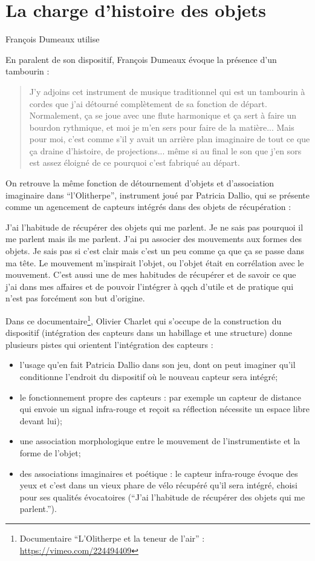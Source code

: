 \section{La charge d'histoire des objets}
François Dumeaux utilise 

En paralent de son dispositif, François Dumeaux évoque la présence d'un tambourin :
\begin{quotation}
J'y adjoins cet instrument de musique traditionnel qui est un tambourin à cordes que j'ai détourné complètement de sa fonction de départ. Normalement, ça se joue avec une flute harmonique et ça sert à faire un bourdon rythmique, et moi je m'en sers pour faire de la matière... Mais pour moi, c'est comme s'il y avait un arrière plan imaginaire de tout ce que ça draine d'histoire, de projections... même si au final le son que j'en sors est assez éloigné de ce pourquoi c'est fabriqué au départ.
\end{quotation}

On retrouve la même fonction de détournement d'objets et d'association imaginaire dans ``l'Olitherpe'', instrument joué par Patricia Dallio, qui se présente comme un agencement de capteurs intégrés dans des objets de récupération : 

J'ai l'habitude de récupérer des objets qui me parlent. Je ne sais pas pourquoi il me parlent mais ils me parlent. J'ai pu associer des mouvements aux formes des objets. Je sais pas si c'est clair mais c'est un peu comme ça que ça se passe dans ma tête. Le mouvement m'inspirait l'objet, ou l'objet était en corrélation avec le mouvement. C'est aussi une de mes habitudes de récupérer et de savoir ce que j'ai dans mes affaires et de pouvoir l'intégrer à qqch d'utile et de pratique qui n'est pas forcément son but d'origine.

Dans ce documentaire\footnote{Documentaire ``L'Olitherpe et la teneur de l'air'' : \url{https://vimeo.com/224494409}}, Olivier Charlet qui s'occupe de la construction du dispositif (intégration des capteurs dans un habillage et une structure) donne plusieurs pistes qui orientent l'intégration des capteurs : 
\begin{itemize}
\item l'usage qu'en fait Patricia Dallio dans son jeu, dont on peut imaginer qu'il conditionne l'endroit du dispositif où le nouveau capteur sera intégré; 
\item le fonctionnement propre des capteurs : par exemple un capteur de distance qui envoie un signal infra-rouge et reçoit sa réflection nécessite un espace libre devant lui);
\item une association morphologique entre le mouvement de l'instrumentiste et la forme de l'objet;
\item des associations imaginaires et poétique : le capteur infra-rouge évoque des yeux et c'est dans un vieux phare de vélo récupéré qu'il sera intégré, choisi pour ses qualités évocatoires (``J'ai l'habitude de récupérer des objets qui me parlent.'').
\end{itemize}



